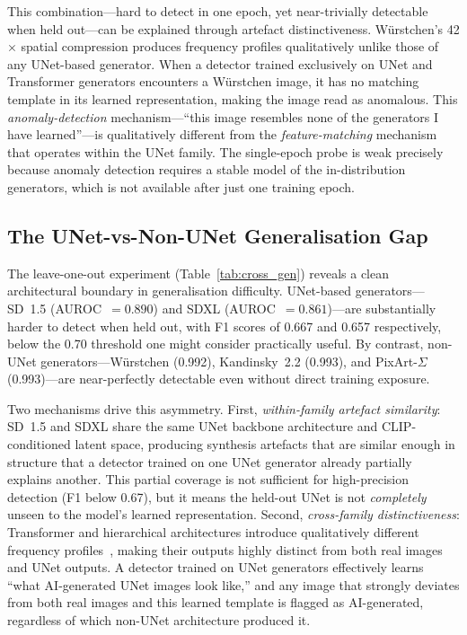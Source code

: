 \documentclass[journal]{IEEEtran}
\begin{document}
This combination---hard to detect in one epoch, yet near-trivially
detectable when held out---can be explained through artefact
distinctiveness.
W\"{u}rstchen's 42$\times$ spatial compression produces frequency
profiles qualitatively unlike those of any UNet-based generator.
When a detector trained exclusively on UNet and Transformer
generators encounters a W\"{u}rstchen image, it has no matching
template in its learned representation, making the image read as
anomalous.
This \emph{anomaly-detection} mechanism---``this image resembles
none of the generators I have learned''---is qualitatively different
from the \emph{feature-matching} mechanism that operates within the
UNet family.
The single-epoch probe is weak precisely because anomaly detection
requires a stable model of the in-distribution generators, which is
not available after just one training epoch.

\subsection{The UNet-vs-Non-UNet Generalisation Gap}
\label{ssec:disc_crossgen}

The leave-one-out experiment (Table~\ref{tab:cross_gen}) reveals
a clean architectural boundary in generalisation difficulty.
UNet-based generators---SD~1.5 (AUROC~$= 0.890$) and SDXL
(AUROC~$= 0.861$)---are substantially harder to detect when held
out, with F1 scores of 0.667 and 0.657 respectively, below the
0.70 threshold one might consider practically useful.
By contrast, non-UNet generators---W\"{u}rstchen (0.992),
Kandinsky~2.2 (0.993), and PixArt-$\Sigma$ (0.993)---are
near-perfectly detectable even without direct training exposure.

Two mechanisms drive this asymmetry.
First, \emph{within-family artefact similarity}: SD~1.5 and SDXL
share the same UNet backbone architecture and CLIP-conditioned
latent space, producing synthesis artefacts that are similar enough
in structure that a detector trained on one UNet generator already
partially explains another.
This partial coverage is not sufficient for high-precision detection
(F1 below 0.67), but it means the held-out UNet is not
\emph{completely} unseen to the model's learned representation.
Second, \emph{cross-family distinctiveness}: Transformer and
hierarchical architectures introduce qualitatively different
frequency profiles~\cite{corvi2023detection}, making their outputs
highly distinct from both real images and UNet outputs.
A detector trained on UNet generators effectively learns ``what
AI-generated UNet images look like,'' and any image that strongly
deviates from both real images and this learned template is flagged
as AI-generated, regardless of which non-UNet architecture produced it.
\end{document}
